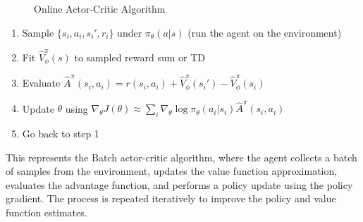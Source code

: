 \documentclass{article}
\begin{document}
\begin{figure}[ht]
\caption{Online Actor-Critic Algorithm}\label{fig:onlice_actor_critic}
\end{figure} 
% 
\begin{center}
\begin{tcolorbox}
[breakable,enhanced,colback=purple!10!white,colframe=purple!30!black,
title={Batch actor-critic algorithm},width=0.7\linewidth]
\begin{enumerate}[\hspace{1cm}(1)]
    \item Sample $\{s_i,a_i,s_i',r_i\}$ under $\pi_\theta(a|s)$ (run the agent on the environment)
    \item Fit $\hat{V}_\phi^\pi(s)$ to sampled reward sum or TD
    \item Evaluate $\hat{A}^\pi(s_i,a_i) = r(s_i,a_i) + \hat{V}_\phi^\pi(s_i') - \hat{V}_\phi^\pi(s_i)$
    \item Update $\theta$ using $\nabla_\theta J(\theta) \approx \sum_i \nabla_\theta \log\pi_\theta(a_i|s_i)\hat{A}^\pi(s_i,a_i)$
    \item Go back to step 1
\end{enumerate}
\end{tcolorbox}
\end{center}

This represents the Batch actor-critic algorithm, where the agent collects a batch of samples from the environment, updates the value function approximation, evaluates the advantage function, and performs a policy update using the policy gradient. The process is repeated iteratively to improve the policy and value function estimates.
\end{document}
